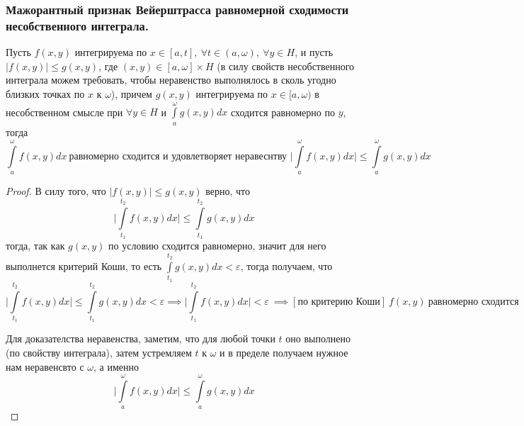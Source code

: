 \subsubsection{Мажорантный признак Вейерштрасса равномерной сходимости несобственного интеграла.}
\begin{theorem*}
    Пусть $f(x,y)$ интегрируема по $x\in[a,t],\ \forall t\in(a,\omega),\ \forall y\in H$, и пусть $|f(x,y)|\leqslant g(x,y)$, где $(x,y)\in [a,\omega]\times H$ (в силу свойств несобственного интеграла можем требовать, чтобы неравенство выполнялось в сколь угодно близких точках по $x$ к $\omega$), причем $g(x,y)$ интегрируема по $x\in[a,\omega)$ в несобственном смысле при $\forall y\in H$ и $\int\limits_a^\omega g(x,y)dx$ сходится равномерно по $y$, тогда
    \begin{equation*}
        \int\limits_{a}^{\omega} f(x,y)dx\ \text{равномерно сходится и удовлетворяет неравеснтву } \Big|\int\limits_a^\omega f(x,y)dx\Big|\leqslant \int\limits_a^\omega g(x,y)dx
    \end{equation*}
\end{theorem*}
\begin{proof}
    В силу того, что $|f(x,y)|\leqslant g(x,y)$ верно, что
   \begin{equation*}
        \Big|\int\limits_{t_1}^{t_2} f(x,y)dx\Big|\leqslant \int\limits_{t_1}^{t_2} g(x,y)dx
    \end{equation*}
    тогда, так как $g(x,y)$ по условию сходится равномерно, значит для него выполнется критерий Коши, то есть $\int\limits_{t_1}^{t_2} g(x,y)dx <\varepsilon$, тогда получаем, что
    \begin{equation*}
        \Big|\int\limits_{t_1}^{t_2} f(x,y)dx\Big|\leqslant \int\limits_{t_1}^{t_2} g(x,y)dx < \varepsilon\implies \Big|\int\limits_{t_1}^{t_2} f(x,y)dx\Big| < \varepsilon\  \implies[\text{по критерию Коши}] \  f(x,y)\  \text{равномерно сходится}
    \end{equation*}

    Для доказателства неравенства, заметим, что для любой точки $t$ оно выполнено (по свойству интеграла), затем устремляем $t$ к $\omega$ и в пределе получаем нужное нам неравенсвто с $\omega$, а именно 
    \begin{equation*}
         \Big|\int\limits_a^\omega f(x,y)dx\Big|\leqslant \int\limits_a^\omega g(x,y)dx
    \end{equation*}
\end{proof}

